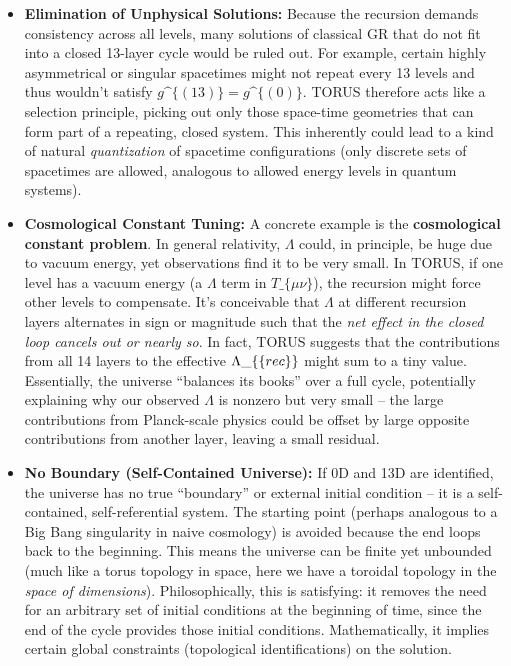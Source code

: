 \documentclass[]{article}
\begin{document}
\begin{itemize}
\item
  \textbf{Elimination of Unphysical Solutions:} Because the recursion
  demands consistency across all levels, many solutions of classical GR
  that do not fit into a closed 13-layer cycle would be ruled out. For
  example, certain highly asymmetrical or singular spacetimes might not
  repeat every 13 levels and thus wouldn't satisfy $g\^{}\{(13)\} =
  g\^{}\{(0)\}$. TORUS therefore acts like a selection principle,
  picking out only those space-time geometries that can form part of a
  repeating, closed system​. This inherently could lead to a kind of
  natural \emph{quantization} of spacetime configurations (only discrete
  sets of spacetimes are allowed, analogous to allowed energy levels in
  quantum systems).
\item
  \textbf{Cosmological Constant Tuning:} A concrete example is the
  \textbf{cosmological constant problem}. In general relativity,
  $\Lambda$ could, in principle, be huge due to vacuum
  energy, yet observations find it to be very small. In TORUS, if one
  level has a vacuum energy (a $\Lambda$ term in
  $T\_\{\mu\nu\}$), the recursion might
  force other levels to compensate. It's conceivable that
  $\Lambda$ at different recursion layers alternates in
  sign or magnitude such that the \emph{net effect in the closed loop
  cancels out or nearly so}. In fact, TORUS suggests that the
  contributions from all 14 layers to the effective
  $\Lambda\_\{\text\{rec\}\}$ might sum
  to a tiny value​. Essentially, the universe ``balances its books''
  over a full cycle, potentially explaining why our observed
  $\Lambda$ is nonzero but very small -- the large
  contributions from Planck-scale physics could be offset by large
  opposite contributions from another layer, leaving a small residual.
\item
  \textbf{No Boundary (Self-Contained Universe):} If 0D and 13D are
  identified, the universe has no true ``boundary'' or external initial
  condition -- it is a self-contained, self-referential system. The
  starting point (perhaps analogous to a Big Bang singularity in naive
  cosmology) is avoided because the end loops back to the beginning​.
  This means the universe can be finite yet unbounded (much like a torus
  topology in space, here we have a toroidal topology in the \emph{space
  of dimensions}). Philosophically, this is satisfying: it removes the
  need for an arbitrary set of initial conditions at the beginning of
  time, since the end of the cycle provides those initial conditions.
  Mathematically, it implies certain global constraints (topological
  identifications) on the solution.
\end{itemize}
\end{document}
